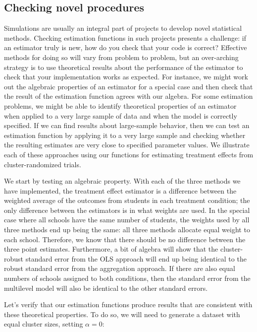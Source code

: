 \documentclass[
]{book}
\begin{document}
\subsection{Checking novel procedures}\label{checking-novel-procedures}

Simulations are usually an integral part of projects to develop novel statistical methods.
Checking estimation functions in such projects presents a challenge: if an estimator truly is new, how do you check that your code is correct?
Effective methods for doing so will vary from problem to problem, but an over-arching strategy is to use theoretical results about the performance of the estimator to check that your implementation works as expected.
For instance, we might work out the algebraic properties of an estimator for a special case and then check that the result of the estimation function agrees with our algebra.
For some estimation problems, we might be able to identify theoretical properties of an estimator when applied to a very large sample of data and when the model is correctly specified.
If we can find results about large-sample behavior, then we can test an estimation function by applying it to a very large sample and checking whether the resulting estimates are very close to specified parameter values.
We illustrate each of these approaches using our functions for estimating treatment effects from cluster-randomized trials.

We start by testing an algebraic property.
With each of the three methods we have implemented, the treatment effect estimator is a difference between the weighted average of the outcomes from students in each treatment condition;
the only difference between the estimators is in what weights are used.
In the special case where all schools have the same number of students, the weights used by all three methods end up being the same: all three methods allocate equal weight to each school.
Therefore, we know that there should be no difference between the three point estimates.
Furthermore, a bit of algebra will show that the cluster-robust standard error from the OLS approach will end up being identical to the robust standard error from the aggregation approach.
If there are also equal numbers of schools assigned to both conditions, then the standard error from the multilevel model will also be identical to the other standard errors.

Let's verify that our estimation functions produce results that are consistent with these theoretical properties.
To do so, we will need to generate a dataset with equal cluster sizes, setting \(\alpha = 0\):
\end{document}
